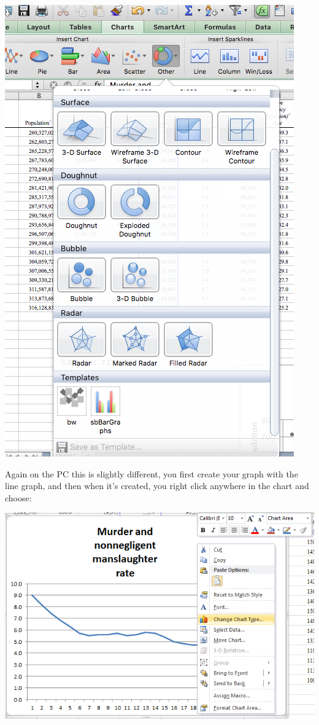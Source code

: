 \documentclass[
]{book}
\begin{document}
\includegraphics{imgs/choose_template.png}

Again on the PC this is slightly different, you first create your graph with the line graph, and then when it's created, you right click anywhere in the chart and choose:

\includegraphics{imgs/pc_apply_template.png}
\end{document}
